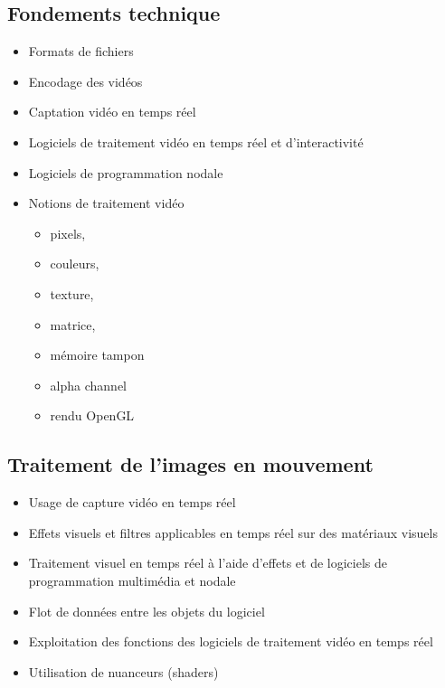 \documentclass[
]{book}
\providecommand{\tightlist}{%
  \setlength{\itemsep}{0pt}\setlength{\parskip}{0pt}}
\begin{document}
\hypertarget{fondements-technique}{%
\subsection{Fondements technique}\label{fondements-technique}}

\begin{itemize}
\tightlist
\item
  Formats de fichiers
\item
  Encodage des vidéos\\
\item
  Captation vidéo en temps réel
\item
  Logiciels de traitement vidéo en temps réel et d'interactivité
\item
  Logiciels de programmation nodale
\item
  Notions de traitement vidéo

  \begin{itemize}
  \tightlist
  \item
    pixels,
  \item
    couleurs,
  \item
    texture,
  \item
    matrice,
  \item
    mémoire tampon
  \item
    alpha channel
  \item
    rendu OpenGL
  \end{itemize}
\end{itemize}

\hypertarget{traitement-de-limages-en-mouvement}{%
\subsection{Traitement de l'images en mouvement}\label{traitement-de-limages-en-mouvement}}

\begin{itemize}
\tightlist
\item
  Usage de capture vidéo en temps réel\\
\item
  Effets visuels et filtres applicables en temps réel sur des matériaux visuels\\
\item
  Traitement visuel en temps réel à l'aide d'effets et de logiciels de programmation multimédia et nodale
\item
  Flot de données entre les objets du logiciel
\item
  Exploitation des fonctions des logiciels de traitement vidéo en temps réel
\item
  Utilisation de nuanceurs (shaders)
\end{itemize}
\end{document}
